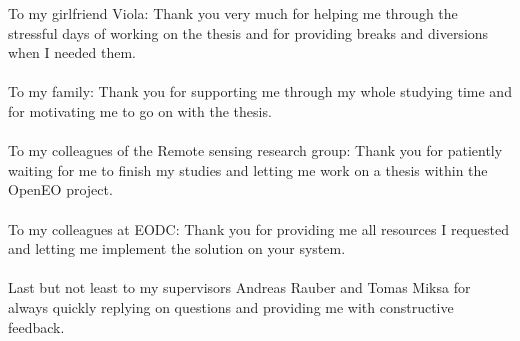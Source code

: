 \documentclass[draft,final]{vutinfth} %
\begin{document}
\frontmatter %

\addstatementpage




\begin{acknowledgements*}
To my girlfriend Viola: Thank you very much for helping me through the stressful days of working on the thesis and for providing breaks and diversions when I needed them.\\ \\
To my family: Thank you for supporting me through my whole studying time and for motivating me to go on with the thesis. \\ \\
To my colleagues of the Remote sensing research group: Thank you for patiently waiting for me to finish my studies and letting me work on a thesis within the OpenEO project. \\ \\
To my colleagues at EODC: Thank you for providing me all resources I requested and letting me implement the solution on your system. \\ \\
Last but not least to my supervisors Andreas Rauber and Tomas Miksa for always quickly replying on questions and providing me with constructive feedback. 
\end{acknowledgements*}
\end{document}
